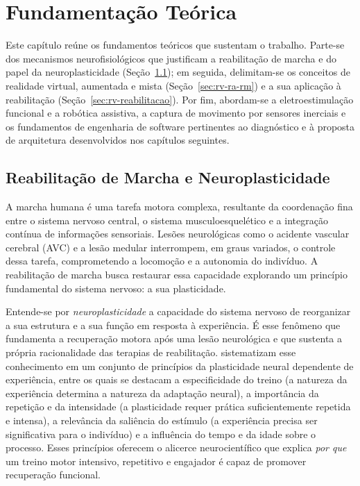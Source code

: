 \chapter{Fundamentação Teórica}
\label{cap:fundamentacao}

Este capítulo reúne os fundamentos teóricos que sustentam o trabalho. Parte-se dos
mecanismos neurofisiológicos que justificam a reabilitação de marcha e do papel da
neuroplasticidade (Seção~\ref{sec:neuroplasticidade}); em seguida, delimitam-se os
conceitos de realidade virtual, aumentada e mista (Seção~\ref{sec:rv-ra-rm}) e a sua
aplicação à reabilitação (Seção~\ref{sec:rv-reabilitacao}). Por fim, abordam-se a
eletroestimulação funcional e a robótica assistiva, a captura de movimento por sensores
inerciais e os fundamentos de engenharia de software pertinentes ao diagnóstico e à
proposta de arquitetura desenvolvidos nos capítulos seguintes.

\section{Reabilitação de Marcha e Neuroplasticidade}
\label{sec:neuroplasticidade}

A marcha humana é uma tarefa motora complexa, resultante da coordenação fina entre o
sistema nervoso central, o sistema musculoesquelético e a integração contínua de
informações sensoriais. Lesões neurológicas como o acidente vascular cerebral (AVC) e a
lesão medular interrompem, em graus variados, o controle dessa tarefa, comprometendo a
locomoção e a autonomia do indivíduo. A reabilitação de marcha busca restaurar essa
capacidade explorando um princípio fundamental do sistema nervoso: a sua plasticidade.

Entende-se por \emph{neuroplasticidade} a capacidade do sistema nervoso de reorganizar a
sua estrutura e a sua função em resposta à experiência. É esse fenômeno que fundamenta a
recuperação motora após uma lesão neurológica e que sustenta a própria racionalidade das
terapias de reabilitação.  sistematizam esse conhecimento em um
conjunto de princípios da plasticidade neural dependente de experiência, entre os quais
se destacam a especificidade do treino (a natureza da experiência determina a natureza da
adaptação neural), a importância da repetição e da intensidade (a plasticidade requer
prática suficientemente repetida e intensa), a relevância da saliência do estímulo (a
experiência precisa ser significativa para o indivíduo) e a influência do tempo e da
idade sobre o processo. Esses princípios oferecem o alicerce neurocientífico que explica
\emph{por que} um treino motor intensivo, repetitivo e engajador é capaz de promover
recuperação funcional.

